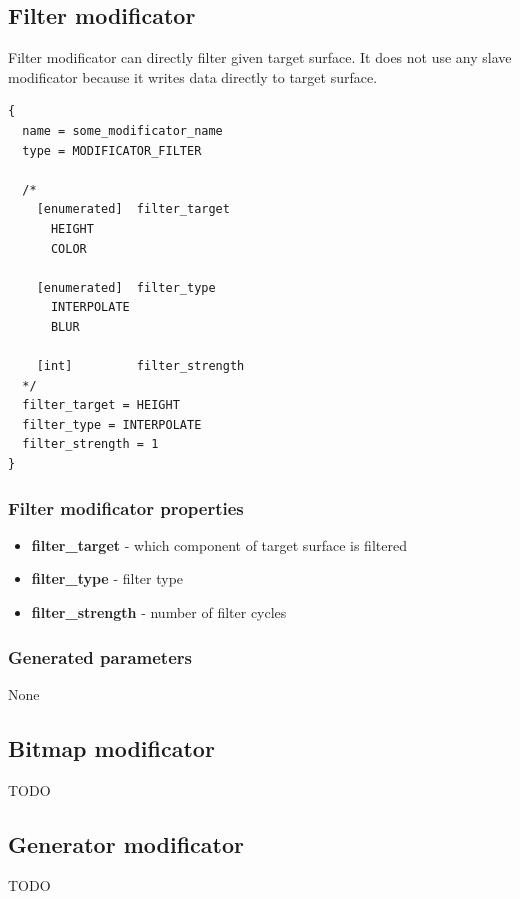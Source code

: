 \documentclass[9pt]{article}
\begin{document}
\newpage
\subsection{Filter modificator}

Filter modificator can directly filter given target surface. 
It does not use any slave modificator because it writes data directly
to target surface.

\begin{verbatim}
{
  name = some_modificator_name
  type = MODIFICATOR_FILTER

  /*      
    [enumerated]  filter_target
      HEIGHT
      COLOR
      
    [enumerated]  filter_type
      INTERPOLATE
      BLUR
      
    [int]         filter_strength
  */
  filter_target = HEIGHT
  filter_type = INTERPOLATE
  filter_strength = 1  
}
\end{verbatim}
\subsubsection*{Filter modificator properties}
\begin{itemize}
\item{\bf filter\_target} - which component of target surface is filtered
\item{\bf filter\_type} - filter type
\item{\bf filter\_strength} - number of filter cycles
\end{itemize}

\subsubsection*{Generated parameters}
None

\subsection{Bitmap modificator}
TODO

\subsection{Generator modificator}
TODO
\end{document}
